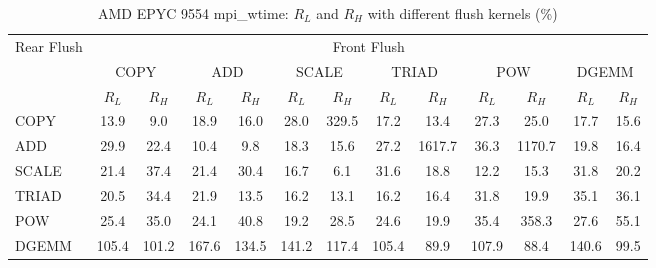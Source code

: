 \begin{table}[htbp]
\centering
\caption{AMD EPYC 9554 mpi\_wtime: $R_L$ and $R_H$ with different flush kernels (\%)}
\label{tab:frkern-camd9554n2-mpi_wtime}
\begin{tabular*}{\textwidth}{@{\extracolsep{\fill}}lcccccccccccc}
\toprule
\multirow{3}{*}{Rear Flush} & \multicolumn{12}{c}{Front Flush} \\ \cmidrule(lr){2-13}
& \multicolumn{2}{c}{COPY} & \multicolumn{2}{c}{ADD} & \multicolumn{2}{c}{SCALE} & \multicolumn{2}{c}{TRIAD} & \multicolumn{2}{c}{POW} & \multicolumn{2}{c}{DGEMM} \\ \cmidrule(lr){2-3} \cmidrule(lr){4-5} \cmidrule(lr){6-7} \cmidrule(lr){8-9} \cmidrule(lr){10-11} \cmidrule(lr){12-13}
& $R_L$ & $R_H$ & $R_L$ & $R_H$ & $R_L$ & $R_H$ & $R_L$ & $R_H$ & $R_L$ & $R_H$ & $R_L$ & $R_H$ \\ \midrule
COPY & 13.9 & 9.0 & 18.9 & 16.0 & 28.0 & 329.5 & 17.2 & 13.4 & 27.3 & 25.0 & 17.7 & 15.6 \\
ADD & 29.9 & 22.4 & 10.4 & 9.8 & 18.3 & 15.6 & 27.2 & 1617.7 & 36.3 & 1170.7 & 19.8 & 16.4 \\
SCALE & 21.4 & 37.4 & 21.4 & 30.4 & 16.7 & 6.1 & 31.6 & 18.8 & 12.2 & 15.3 & 31.8 & 20.2 \\
TRIAD & 20.5 & 34.4 & 21.9 & 13.5 & 16.2 & 13.1 & 16.2 & 16.4 & 31.8 & 19.9 & 35.1 & 36.1 \\
POW & 25.4 & 35.0 & 24.1 & 40.8 & 19.2 & 28.5 & 24.6 & 19.9 & 35.4 & 358.3 & 27.6 & 55.1 \\
DGEMM & 105.4 & 101.2 & 167.6 & 134.5 & 141.2 & 117.4 & 105.4 & 89.9 & 107.9 & 88.4 & 140.6 & 99.5 \\
\bottomrule
\end{tabular*}
\end{table}